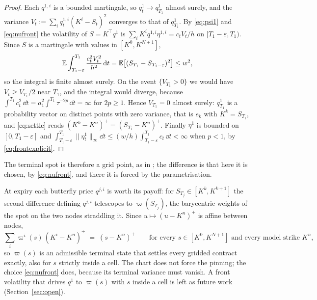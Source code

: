 \begin{proof}
Each $q^{1,i}$ is a bounded martingale, so $q^1_t\to q^1_{T_1}$ almost surely, and the
variance $V_t:=\sum_iq^{1,i}_{t}(K^i-S_t)^2$ converges to that of $q^1_{T_1}$. By
\eqref{eq:psi1} and \eqref{eq:nufront} the volatility of $S=K^{\!\top}q^1$ is
$\sum_iK^iq^{1,i}\eta^{1,i}=c_tV_t/h$ on $[T_1-\varepsilon,T_1)$. Since $S$ is a martingale with values in
$[K^0,K^{N+1}]$,
\[
  \mathbb E\int_{T_1-\varepsilon}^{T_1}\frac{c_t^2V_t^2}{h^2}\,\mathrm d t
  =\mathbb E\bigl[(S_{T_1}-S_{T_1-\varepsilon})^2\bigr]\le w^2 ,
\]
so the integral is finite almost surely. On the event $\{V_{T_1}>0\}$ we would have
$V_t\ge V_{T_1}/2$ near $T_1$, and the integral would diverge, because
$\int^{T_1}c_t^2\,\dd t=a_1^2\int^{T_1}\tau^{-2p}\,\dd t=\infty$ for $2p\ge1$. Hence
$V_{T_1}=0$ almost surely: $q^1_{T_1}$ is a probability vector on distinct points with
zero variance, that is $e_k$ with $K^k=S_{T_1}$, and \eqref{eq:settle} reads
$(K^k-K^n)^{+}=(S_{T_1}-K^n)^{+}$. Finally $\eta^1$ is bounded on $[0,T_1-\varepsilon]$ and
$\int_{T_1-\varepsilon}^{T_1}\lVert\eta^1_t\rVert_\infty\dd t\le
(w/h)\int_{T_1-\varepsilon}^{T_1}c_t\,\dd t<\infty$ when $p<1$, by
\eqref{eq:frontexplicit}.
\end{proof}

The terminal spot is therefore a grid point, as in \cite{Wissel2007}; the difference is
that here it is chosen, by \eqref{eq:nufront}, and there it is forced by the
parametrisation.

\begin{remark}\label{rem:bary}
At expiry each butterfly price $q^{j,i}$ is worth its payoff: for $S_{T_j}\in[K^k,K^{k+1}]$ the
second difference defining $q^{j,i}$ telescopes to $\varpi(S_{T_j})$, the barycentric
weights of the spot on the two nodes straddling it. Since $u\mapsto(u-K^n)^{+}$ is affine
between nodes,
\begin{equation}\label{eq:barypayoff}
  \sum_i \varpi^i(s)\,(K^i-K^n)^{+}\;=\;(s-K^n)^{+}
  \qquad\text{for every }s\in[K^0,K^{N+1}]\text{ and every model strike }K^n ,
\end{equation}
so $\varpi(s)$ is an admissible terminal state that settles every gridded contract exactly,
also for $s$ strictly inside a cell. The chart does not force the pinning; the choice
\eqref{eq:nufront} does, because its terminal variance must vanish. A front volatility
that drives $q^1$ to $\varpi(s)$ with $s$ inside a cell is left as future work
(Section~\ref{sec:open}).
\end{remark}
